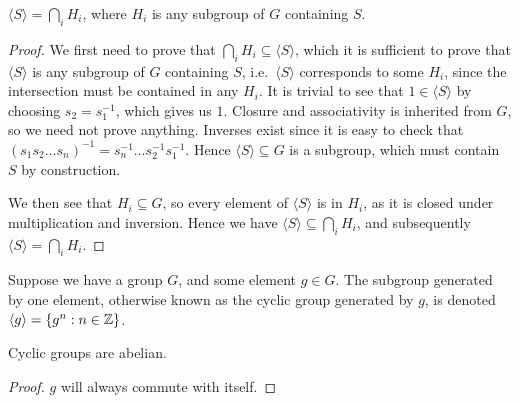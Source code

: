 \begin{proposition}\label{prop:subset-generated-subgroup}
    \(\langle S \rangle = \bigcap_i H_i\),
    where \(H_i\) is any subgroup of \(G\) containing \(S\).
\end{proposition}
\begin{proof}
    We first need to prove that
    \(\bigcap_i H_i \subseteq \langle S \rangle\),
    which it is sufficient to prove that \(\langle S \rangle\)
    is any subgroup of \(G\) containing \(S\),
    i.e.\ \(\langle S \rangle\) corresponds to some \(H_i\),
    since the intersection must be contained in any \(H_i\).
    It is trivial to see that \(1 \in \langle S \rangle\)
    by choosing \(s_2 = s_1^{-1}\), which gives us \(1\).
    Closure and associativity is inherited from \(G\),
    so we need not prove anything.
    Inverses exist since it is easy to check that
    \({(s_1 s_2 \hdots s_n)}^{-1} = s_n^{-1} \hdots s_2^{-1} s_1^{-1}\).
    Hence \(\langle S \rangle \subseteq G\) is a subgroup,
    which must contain \(S\) by construction.

    We then see that \(H_i \subseteq G\),
    so every element of \(\langle S \rangle\) is in \(H_i\),
    as it is closed under multiplication and inversion.
    Hence we have \(\langle S \rangle \subseteq \bigcap_i H_i\),
    and subsequently \(\langle S \rangle = \bigcap_i H_i\).
\end{proof}

\begin{definition}
    Suppose we have a group \(G\),
    and some element \(g \in G\).
    The subgroup generated by one element,
    otherwise known as the cyclic group generated by \(g\),
    is denoted \(\langle g \rangle = \{g^n : n \in \mathbb{Z}\}\).
\end{definition}
\begin{proposition}
    Cyclic groups are abelian.
\end{proposition}
\begin{proof}
    \(g\) will always commute with itself.
\end{proof}

